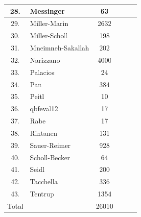 \documentclass[runningheads]{llncs}
\begin{document}
\begin{table}
\begin{tabular}{c|l|c|c|c|c}
28. & Messinger &  63 & &  &  \\ \hline

29. & Miller-Marin & 2632 & &  &  \\ \hline

30. & Miller-Scholl & 198 & &  &  \\ \hline

31. & Mneimneh-Sakallah &  202 & &  &  \\ \hline

32. & Narizzano &  4000 & &  &  \\ \hline

33. & Palacios & 24 &  &  &  \\ \hline

34. & Pan &  384 & &  &  \\ \hline

35. & Peitl & 10 &  &  &  \\\hline

36. & qbfeval12 & 17 & &  &  \\ \hline

37. & Rabe &  17 &  & &  \\ \hline

38. & Rintanen &  131 & &  &  \\\hline

39. & Sauer-Reimer &  928 & &  & \\ \hline

40. & Scholl-Becker & 64 &  &  &  \\ \hline

41. & Seidl &  200 &  &  &  \\ \hline

42. & Tacchella &  336 & &  &  \\ \hline

43. & Tentrup & 1354 &  &  &  \\ \hline \hline

Total &  & 26010 &  &  &  \\  \hline \hline


\hline
\end{tabular}
\end{table}
\end{document}

